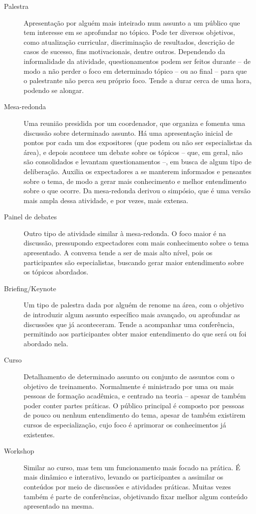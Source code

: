 \documentclass[12pt,a4paper,twoside,hyphens,english,brazil]{abntex2}
\begin{document}
\begin{description}
	\item[Palestra] Apresentação por alguém mais inteirado num assunto a um público que tem interesse em se aprofundar no tópico. Pode ter diversos objetivos, como atualização curricular, discriminação de resultados, descrição de casos de sucesso, fins motivacionais, dentre outros. Dependendo da informalidade da atividade, questionamentos podem ser feitos durante -- de modo a não perder o foco em determinado tópico -- ou ao final -- para que o palestrante não perca seu próprio foco. Tende a durar cerca de uma hora, podendo se alongar. 

	\item[Mesa-redonda] Uma reunião presidida por um coordenador, que organiza e fomenta uma discussão sobre determinado assunto. Há uma apresentação inicial de pontos por cada um dos expositores (que podem ou não ser especialistas da área), e depois acontece um debate sobre os tópicos -- que, em geral, não são consolidados e levantam questionamentos --, em busca de algum tipo de deliberação. Auxilia os expectadores a se manterem informados e pensantes sobre o tema, de modo a gerar mais conhecimento e melhor entendimento sobre o que ocorre. Da mesa-redonda derivou o simpósio, que é uma versão mais ampla dessa atividade, e por vezes, mais extensa.

	\item[Painel de debates] Outro tipo de atividade similar à mesa-redonda. O foco maior é na discussão, pressupondo expectadores com mais conhecimento sobre o tema apresentado. A conversa tende a ser de mais alto nível, pois os participantes são especialistas, buscando gerar maior entendimento sobre os tópicos abordados.

	\item[Briefing/Keynote] Um tipo de palestra dada por alguém de renome na área, com o objetivo de introduzir algum assunto específico mais avançado, ou aprofundar as discussões que já aconteceram. Tende a acompanhar uma conferência, permitindo aos participantes obter maior entendimento do que será ou foi abordado nela.

	\item[Curso] Detalhamento de determinado assunto ou conjunto de assuntos com o objetivo de treinamento. Normalmente é ministrado por uma ou mais pessoas de formação acadêmica, e centrado na teoria -- apesar de também poder conter partes práticas. O público principal é composto por pessoas de pouco ou nenhum entendimento do tema, apesar de também existirem cursos de especialização, cujo foco é aprimorar os conhecimentos já existentes.

	\item[Workshop] Similar ao curso, mas tem um funcionamento mais focado na prática. É mais dinâmico e interativo, levando os participantes a assimilar os conteúdos por meio de discussões e atividades práticas. Muitas vezes também é parte de conferências, objetivando fixar melhor algum conteúdo apresentado na mesma.
\end{description}
\end{document}
